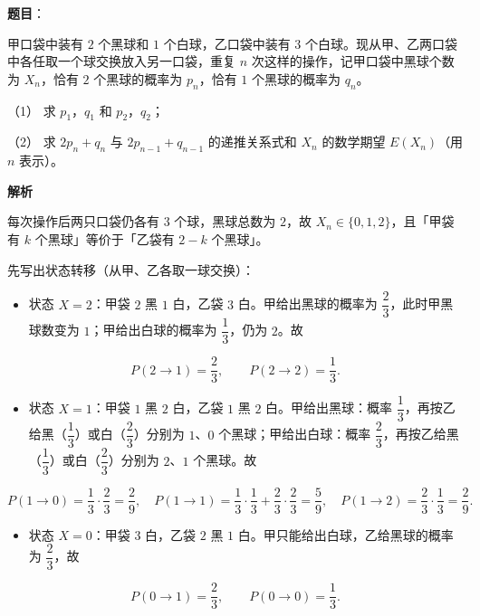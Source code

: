 \begin{answer}


\end{answer}
\begin{answer}

\textbf{题目}：

甲口袋中装有 $2$ 个黑球和 $1$ 个白球，乙口袋中装有 $3$ 个白球。现从甲、乙两口袋中各任取一个球交换放入另一口袋，重复 $n$ 次这样的操作，记甲口袋中黑球个数为 $X_n$，恰有 $2$ 个黑球的概率为 $p_n$，恰有 $1$ 个黑球的概率为 $q_n$。

（1） 求 $p_1$，$q_1$ 和 $p_2$，$q_2$；

（2） 求 $2p_n+q_n$ 与 $2p_{n-1}+q_{n-1}$ 的递推关系式和 $X_n$ 的数学期望 $E(X_n)$（用 $n$ 表示）。

\textbf{解析}

每次操作后两只口袋仍各有 $3$ 个球，黑球总数为 $2$，故 $X_n\in\{0,1,2\}$，且「甲袋有 $k$ 个黑球」等价于「乙袋有 $2-k$ 个黑球」。

先写出状态转移（从甲、乙各取一球交换）：

\begin{itemize}
\item 状态 $X=2$：甲袋 $2$ 黑 $1$ 白，乙袋 $3$ 白。甲给出黑球的概率为 $\dfrac23$，此时甲黑球数变为 $1$；甲给出白球的概率为 $\dfrac13$，仍为 $2$。故
\end{itemize}
\nopagebreak[4]
\[P(2\to1)=\frac23,\qquad P(2\to2)=\frac13 .\]
\begin{itemize}
\item 状态 $X=1$：甲袋 $1$ 黑 $2$ 白，乙袋 $1$ 黑 $2$ 白。甲给出黑球：概率 $\dfrac13$，再按乙给黑（$\dfrac13$）或白（$\dfrac23$）分别为 $1$、$0$ 个黑球；甲给出白球：概率 $\dfrac23$，再按乙给黑（$\dfrac13$）或白（$\dfrac23$）分别为 $2$、$1$ 个黑球。故
\end{itemize}
\nopagebreak[4]
\[P(1\to0)=\frac13\cdot\frac23=\frac29,\quad P(1\to1)=\frac13\cdot\frac13+\frac23\cdot\frac23=\frac59,\quad P(1\to2)=\frac23\cdot\frac13=\frac29 .\]
\begin{itemize}
\item 状态 $X=0$：甲袋 $3$ 白，乙袋 $2$ 黑 $1$ 白。甲只能给出白球，乙给黑球的概率为 $\dfrac23$，故
\end{itemize}
\nopagebreak[4]
\[P(0\to1)=\frac23,\qquad P(0\to0)=\frac13 .\]


\end{answer}
